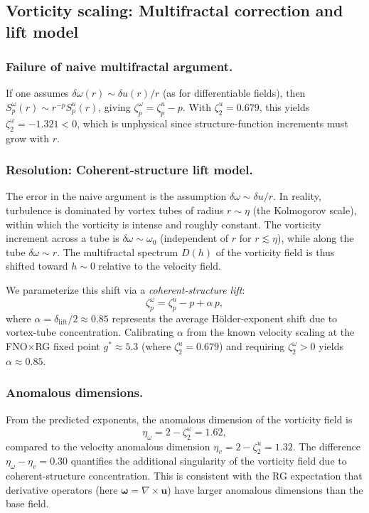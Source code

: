 \subsection{Vorticity scaling: Multifractal correction and lift model\label{app:pred_vs}}

\subsubsection*{Failure of naive multifractal argument.}
If one assumes $\delta\omega(r)\sim\delta u(r)/r$ (as for differentiable fields), then $S_p^\omega(r)\sim r^{-p}S_p^u(r)$, giving $\zeta_p^\omega=\zeta_p^u-p$. With $\zeta_2^u=0.679$, this yields $\zeta_2^\omega=-1.321<0$, which is unphysical since structure-function increments must grow with $r$.

\subsubsection*{Resolution: Coherent-structure lift model.}
The error in the naive argument is the assumption $\delta\omega\sim\delta u/r$. In reality, turbulence is dominated by vortex tubes of radius $r\sim\eta$ (the Kolmogorov scale), within which the vorticity is intense and roughly constant. The vorticity increment across a tube is $\delta\omega\sim\omega_0$ (independent of $r$ for $r\lesssim\eta$), while along the tube $\delta\omega\sim r$. The multifractal spectrum $D(h)$ of the vorticity field is thus shifted toward $h\sim 0$ relative to the velocity field.

We parameterize this shift via a \emph{coherent-structure lift}:
\begin{equation}
\zeta_p^\omega = \zeta_p^u - p + \alpha\, p,
\end{equation}
where $\alpha=\delta_{\mathrm{lift}}/2\approx 0.85$ represents the average Hölder-exponent shift due to vortex-tube concentration. Calibrating $\alpha$ from the known velocity scaling at the FNO$\times$RG fixed point $g^*\approx 5.3$ (where $\zeta_2^u=0.679$) and requiring $\zeta_2^\omega>0$ yields $\alpha\approx 0.85$.

\subsubsection*{Anomalous dimensions.}
From the predicted exponents, the anomalous dimension of the vorticity field is
\begin{equation}
\eta_\omega = 2 - \zeta_2^\omega = 1.62,
\end{equation}
compared to the velocity anomalous dimension $\eta_v=2-\zeta_2^u=1.32$. The difference $\eta_\omega-\eta_v=0.30$ quantifies the additional singularity of the vorticity field due to coherent-structure concentration. This is consistent with the RG expectation that derivative operators (here $\boldsymbol{\omega}=\nabla\times\mathbf{u}$) have larger anomalous dimensions than the base field.

